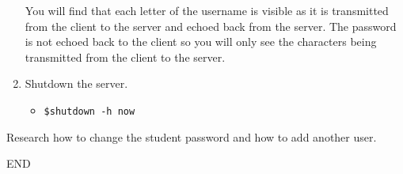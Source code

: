 \documentclass[11pt]{article}
\begin{document}
\begin{enumerate}
        \begin{tcolorbox}[colback=blue!20]
            You will find that each letter of the username is visible as it is transmitted from the client to the server and echoed back from the server.
            The password is not echoed back to the client so you will only see the characters being transmitted from the client to the server.
        \end{tcolorbox}
    \item Shutdown the server.
        \begin{itemize}
            \item \texttt{\$shutdown -h now}
        \end{itemize}
    \end{enumerate}
    \begin{tcolorbox}[colback=blue!20,title={\textbf{TIME PERMITTING:}}]
        Research how to change the student password and how to add another user.
    \end{tcolorbox}
END
\end{document}
